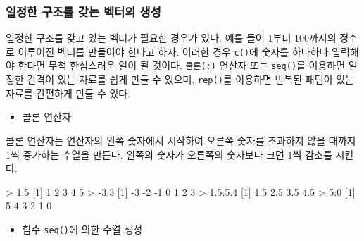\documentclass[
]{book}
\newenvironment{Shaded}{\begin{snugshade}}{\end{snugshade}}
\newcommand{\DecValTok}[1]{\textcolor[rgb]{0.00,0.00,0.81}{#1}}
\newcommand{\FloatTok}[1]{\textcolor[rgb]{0.00,0.00,0.81}{#1}}
\newcommand{\NormalTok}[1]{#1}
\newcommand{\SpecialCharTok}[1]{\textcolor[rgb]{0.00,0.00,0.00}{#1}}
\providecommand{\tightlist}{%
  \setlength{\itemsep}{0pt}\setlength{\parskip}{0pt}}
\begin{document}
\hypertarget{uxc77cuxc815uxd55c-uxad6cuxc870uxb97c-uxac16uxb294-uxbca1uxd130uxc758-uxc0dduxc131}{%
\subsubsection{일정한 구조를 갖는 벡터의 생성}\label{uxc77cuxc815uxd55c-uxad6cuxc870uxb97c-uxac16uxb294-uxbca1uxd130uxc758-uxc0dduxc131}}

일정한 구조를 갖고 있는 벡터가 필요한 경우가 있다. 예를 들어 1부터 100까지의 정수로 이루어진 벡터를 만들어야 한다고 하자. 이러한 경우 \texttt{c()}에 숫자를 하나하나 입력해야 한다면 무척 한심스러운 일이 될 것이다.
\texttt{콜론(:)} 연산자 또는 \texttt{seq()}를 이용하면 일정한 간격이 있는 자료를 쉽게 만들 수 있으며, \texttt{rep()}를 이용하면 반복된 패턴이 있는 자료를 간편하게 만들 수 있다.

\begin{itemize}
\tightlist
\item
  콜론 연산자
\end{itemize}

콜론 연산자는 연산자의 왼쪽 숫자에서 시작하여 오른쪽 숫자를 초과하지 않을 때까지 1씩 증가하는 수열을 만든다. 왼쪽의 숫자가 오른쪽의 숫자보다 크면 1씩 감소를 시킨다.

\begin{Shaded}
\begin{Highlighting}[]
\SpecialCharTok{\textgreater{}} \DecValTok{1}\SpecialCharTok{:}\DecValTok{5}
\NormalTok{[}\DecValTok{1}\NormalTok{] }\DecValTok{1} \DecValTok{2} \DecValTok{3} \DecValTok{4} \DecValTok{5}
\SpecialCharTok{\textgreater{}} \SpecialCharTok{{-}}\DecValTok{3}\SpecialCharTok{:}\DecValTok{3}
\NormalTok{[}\DecValTok{1}\NormalTok{] }\SpecialCharTok{{-}}\DecValTok{3} \SpecialCharTok{{-}}\DecValTok{2} \SpecialCharTok{{-}}\DecValTok{1}  \DecValTok{0}  \DecValTok{1}  \DecValTok{2}  \DecValTok{3}
\SpecialCharTok{\textgreater{}} \FloatTok{1.5}\SpecialCharTok{:}\FloatTok{5.4}
\NormalTok{[}\DecValTok{1}\NormalTok{] }\FloatTok{1.5} \FloatTok{2.5} \FloatTok{3.5} \FloatTok{4.5}
\SpecialCharTok{\textgreater{}} \DecValTok{5}\SpecialCharTok{:}\DecValTok{0}
\NormalTok{[}\DecValTok{1}\NormalTok{] }\DecValTok{5} \DecValTok{4} \DecValTok{3} \DecValTok{2} \DecValTok{1} \DecValTok{0}
\end{Highlighting}
\end{Shaded}

\begin{itemize}
\tightlist
\item
  함수 \texttt{seq()}에 의한 수열 생성
\end{itemize}
\end{document}
